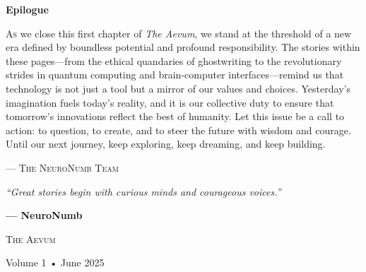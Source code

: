 \documentclass[a4paper,10pt,twocolumn]{memoir}
\begin{document}
\clearpage
\thispagestyle{empty}
\begin{center}
\vspace*{1cm}
{\large\bfseries\color{primary}Epilogue}
\vspace{0.5cm}
\vspace{0.5cm}
\end{center}
\lettrine[lines=3]{A}{s} we close this first chapter of \textit{The Aevum}, we stand at the threshold of a new era defined by boundless potential and profound responsibility. The stories within these pages—from the ethical quandaries of ghostwriting to the revolutionary strides in quantum computing and brain-computer interfaces—remind us that technology is not just a tool but a mirror of our values and choices. Yesterday’s imagination fuels today’s reality, and it is our collective duty to ensure that tomorrow’s innovations reflect the best of humanity. Let this issue be a call to action: to question, to create, and to steer the future with wisdom and courage. Until our next journey, keep exploring, keep dreaming, and keep building.
\begin{center}
\vspace{0.5cm}
{\small\scshape\color{gray}— The NeuroNumb Team}
\end{center}
\vspace*{\fill}


\clearpage
\thispagestyle{empty}
\begin{center}
\begin{minipage}{\textwidth}
\centering
\vspace*{\fill}
\vspace{8.5cm}

{\Large\itshape\color{primary}``Great stories begin with curious minds and courageous voices.''}

\vspace{0.8em} %
{\large\bfseries\color{dark}— NeuroNumb}

\vspace{1.5cm} %

\vspace{0.8em} %
{\large\scshape\color{dark}The Aevum}

\vspace{0.3em} %
{\small\color{gray}Volume 1 • June 2025}

\vspace{0.3em} %

\vspace*{\fill}
\end{minipage}
\end{center}
\end{document}
